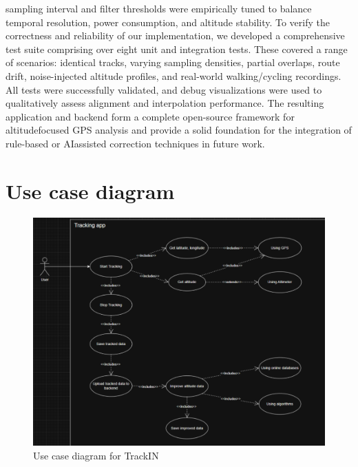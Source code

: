 \documentclass[12pt]{article}
\begin{document}
sampling interval and filter thresholds were empirically tuned to balance temporal
resolution, power consumption, and altitude stability.
To verify the correctness and reliability of our implementation, we developed a
comprehensive test suite comprising over eight unit and integration tests. These covered a
range of scenarios: identical tracks, varying sampling densities, partial overlaps, route drift,
noise-injected altitude profiles, and real-world walking/cycling recordings. All tests were
successfully validated, and debug visualizations were used to qualitatively assess alignment
and interpolation performance.
The resulting application and backend form a complete open-source framework for altitudefocused GPS analysis and provide a solid foundation for the integration of rule-based or AIassisted correction techniques in future work.

\newpage
\section{Use case diagram}
\begin{figure}[h!]
    \centering
    \includegraphics[width=\textwidth]{Project_Screenshots/usecase.png}
    \caption{Use case diagram for TrackIN}
\end{figure}
\end{document}
